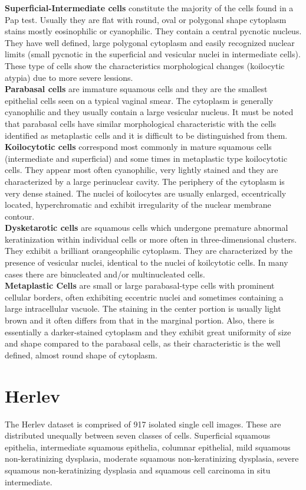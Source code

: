 \documentclass[ms,electronic,oneside,twosidetoc,letterpaper,chaptercenter,parttop]{byumsphd}
\begin{document}
\noindent \textbf{Superficial-Intermediate cells} constitute the majority of the cells found in a Pap test. Usually they are flat with round, oval or polygonal shape cytoplasm stains mostly eosinophilic or cyanophilic. They contain a central pycnotic nucleus. They have well defined, large polygonal cytoplasm and easily recognized nuclear limits (small pycnotic in the superficial and vesicular nuclei in intermediate cells). These type of cells show the characteristics morphological changes (koilocytic atypia) due to more severe lessions.
\\ \textbf{Parabasal cells} are immature squamous cells and they are the smallest epithelial cells seen on a typical vaginal smear. The cytoplasm is generally cyanophilic and they usually contain a large vesicular nucleus. It must be noted that parabasal cells have similar morphological characteristic with the cells identified as metaplastic cells and it is difficult to be distinguished from them.    
\\ \textbf{Koilocytotic cells} correspond most commonly in mature squamous cells (intermediate and superficial) and some times in metaplastic type koilocytotic cells. They appear most often cyanophilic, very lightly stained and they are characterized by a large perinuclear cavity. The periphery of the cytoplasm is very dense stained. The nuclei of koilocytes are usually enlarged, eccentrically located, hyperchromatic and exhibit irregularity of the nuclear membrane contour. 
\\ \textbf{Dysketarotic cells} are squamous cells which undergone premature abnormal keratinization within individual cells or more often in three-dimensional clusters. They exhibit a brilliant orangeophilic cytoplasm. They are characterized by the presence of vesicular nuclei, identical to the nuclei of koilcytotic cells. In many cases there are binucleated and/or multinucleated cells.
\\ \textbf{Metaplastic Cells} are small or large parabasal-type cells with prominent cellular borders, often exhibiting eccentric nuclei and sometimes containing a large intracellular vacuole. The staining in the center portion is usually light brown and it often differs from that in the marginal portion. Also, there is essentially a darker-stained cytoplasm and they exhibit great uniformity of size and shape compared to the parabasal cells, as their characteristic is the well defined, almost round shape of cytoplasm.\cite{sipakmed}

\section{Herlev}
The Herlev dataset is comprised of 917 isolated single cell images. These are distributed unequally between seven classes of cells.  Superficial squamous epithelia, intermediate squamous epithelia, columnar epithelial, mild squamous non-keratinizing dysplasia, moderate squamous non-keratinizing dysplasia, severe squamous non-keratinizing dysplasia and squamous cell carcinoma in situ intermediate.\cite{herlev}
\end{document}
